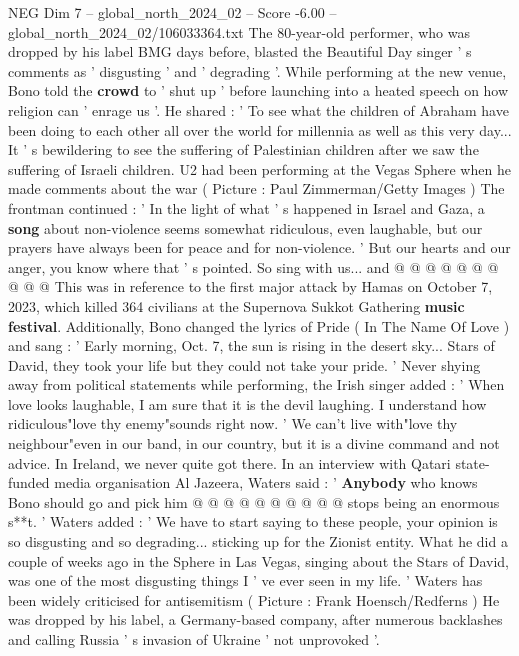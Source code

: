 \begin{textsample}{NEG Dim 7 – global\_north\_2024\_02 – Score -6.00 – global\_north\_2024\_02/106033364.txt}  \label{ex:f7_neg_289}
The 80-year-old performer, who was dropped by his label BMG days before, blasted the Beautiful Day singer ' s comments as ' disgusting ' and ' degrading '.
While performing at the new venue, Bono told the \textbf{crowd} to ' shut up ' before launching into a heated speech on how religion can ' enrage us '.
He shared : ' To see what the children of Abraham have been doing to each other all over the world for millennia as well as this very day...
It ' s bewildering to see the suffering of Palestinian children after we saw the suffering of Israeli children.
U2 had been performing at the Vegas Sphere when he made comments about the war ( Picture : Paul Zimmerman/Getty Images ) The frontman continued : ' In the light of what ' s happened in Israel and Gaza, a \textbf{song} about non-violence seems somewhat ridiculous, even laughable, but our prayers have always been for peace and for non-violence. ' But our hearts and our anger, you know where that ' s pointed.
So sing with us... and @ @ @ @ @ @ @ @ @ @ This was in reference to the first major attack by Hamas on October 7, 2023, which killed 364 civilians at the Supernova Sukkot Gathering \textbf{music} \textbf{festival}.
Additionally, Bono changed the lyrics of Pride ( In The Name Of Love ) and sang : ' Early morning, Oct. 7, the sun is rising in the desert sky...
Stars of David, they took your life but they could not take your pride. ' Never shying away from political statements while performing, the Irish singer added : ' When love looks laughable, I am sure that it is the devil laughing.
I understand how ridiculous"love thy enemy"sounds right now. ' We can't live with"love thy neighbour"even in our band, in our country, but it is a divine command and not advice.
In Ireland, we never quite got there.
In an interview with Qatari state-funded media organisation Al Jazeera, Waters said : ' \textbf{Anybody} who knows Bono should go and pick him @ @ @ @ @ @ @ @ @ @ stops being an enormous s**t. ' Waters added : ' We have to start saying to these people, your opinion is so disgusting and so degrading... sticking up for the Zionist entity.
What he did a couple of weeks ago in the Sphere in Las Vegas, singing about the Stars of David, was one of the most disgusting things I ' ve ever seen in my life. ' Waters has been widely criticised for antisemitism ( Picture : Frank Hoensch/Redferns ) He was dropped by his label, a Germany-based company, after numerous backlashes and calling Russia ' s invasion of Ukraine ' not unprovoked '.

\end{textsample}
